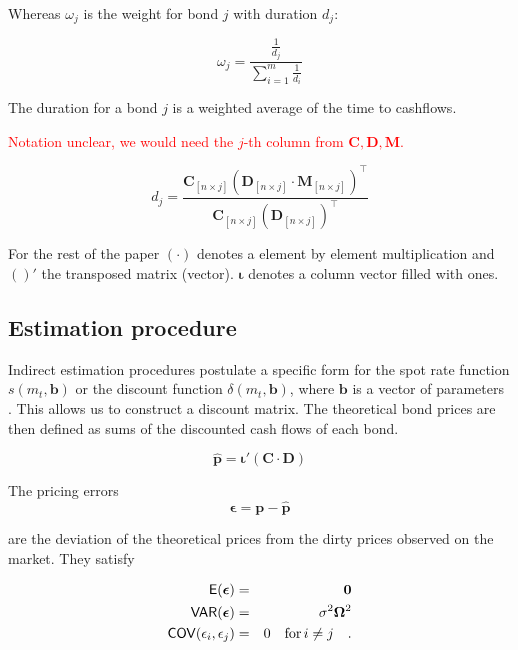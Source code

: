 Whereas $\omega_j$ is the weight for bond $j$ with duration $d_j$:

\begin{displaymath}
    \omega_j=\frac{\frac{1}{d_j}}{\sum_{i=1}^m\frac{1}{d_i}}
\end{displaymath}


The duration for a bond $j$ is a weighted average of the time to cashflows.

\textcolor{red}{Notation unclear, we would need the $j$-th column from $\bm{C,D,M}$.}

\begin{equation}\label{duration}
d_j= \frac{\bm{C}_{\left[n \times j\right]} \left(\bm{D}_{\left[n\times j\right]} \cdot \bm{M}_{\left[n\times j\right]}\right)^{\top}} {\bm{C}_{\left[n \times j\right]}\left(\bm{D}_{\left[n\times j\right]}\right)^{\top}}
\end{equation}



For the rest of the paper $(\cdot)$ denotes a element by element multiplication and $( )'$ the transposed matrix (vector). $\bm{\iota}$ denotes a column vector filled with ones.

\subsection{Estimation procedure}
\label{sec:estimation}

Indirect estimation procedures postulate a specific form for the spot rate function $s(m_t, \bm{b})$ or the discount function $\delta(m_t, \bm{b})$, where $\bm{b}$ is a vector of parameters \citep[see, e.g.][]{Martellini2003}. This allows us to construct a discount matrix. The theoretical bond prices are then defined as sums of the discounted cash flows of each bond.

\begin{equation}
  \label{eq:theorprices}
  \bm{\hat{p}} = \bm{\iota}'(\bm{C}\cdot\bm{D})
\end{equation}



The pricing errors
\begin{equation}
  \label{eq:pricingerrors}
  \bm{\epsilon} = \bm{p-\hat{p}}
\end{equation}

are the deviation of the theoretical prices from the dirty prices observed on the market. They satisfy

\begin{eqnarray}
  \label{eq:residuals}
  \mathsf{E}(\bm{\epsilon}) &=& \bm{0}\\
  \mathsf{VAR}(\bm{\epsilon}) &=&\sigma^2\bm{\Omega}^2 \\
  \mathsf{COV}(\epsilon_i, \epsilon_j) &=& 0 \quad \mbox{for}\,i\neq j\quad .
\end{eqnarray}

